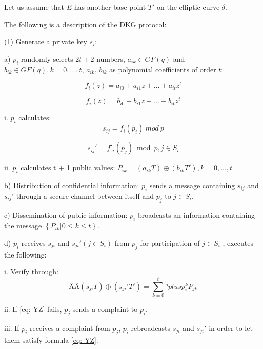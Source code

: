 \documentclass[a4paper,12pt]{article}
\begin{document}
Let us assume that $E$ has another base point $T'$ on the elliptic curve $\delta$.

The following is a description of the DKG protocol:

(1) Generate a private key ${s_i}$:

a) $p_{i}$ randomly selects $2t + 2$ numbers, $a_{ik} \in GF (q)$ and $b_{ik} \in GF (q), k = 0,..., t$, $a_{ik}$, $b_{ik}$ as polynomial coefficients of order $t$:

\begin{equation}
  \label{eq: TA}
  f_i (z) = a_{i0} + a_{i1} z + ... + a_{it} z^t
\end{equation}

\begin{equation}
  \label{eq: TA}
  f_i (z) = b_{i0} + b_{i1} z + ... + b_{it} z^t
\end{equation}

i. $p_i$ calculates:
\begin{equation}
  \label{eq: TA}
 s_{ij} = f_i(p_i)\ mod \ p
\end{equation}

\begin{equation}
  \label{eq: TA}
 {s_{ij}}'= f{'_i} \left({{p_j}} \right) \bmod p, j \in{S_i}%
\end{equation}

ii. $p_i$ calculates t + 1 public values: ${P_{ik}} = \left({{a_{ik}} T} \right) \oplus \left({{b_{ik}} T' } \right), k = 0, ..., t$

b) Distribution of confidential information: $p_i$ sends a message containing $s_{ij}$ and ${s_{ij}}'$ through a secure channel between itself and  $p_j$ to $j \in S_i$.

c) Dissemination of public information: $p_i$ broadcasts an information containing the message $\left \{{{P_{ik}}|0 \le k \le t} \right \}$.

d) $ p_i$ receives $s_{ji}$ and ${s_{ji}}'\left(j \in S_i \right)$ from  $ p_j$ for participation of $ j \in S_i$ , executes the following:

i. Verify through:
\begin{equation}
Â Â \label{eq: YZ}
\left({{s_{ji}} T} \right) \oplus \left({{s_{ji}}'T'} \right) = \sum \limits_{k = 0}^t{}^oplus p_i^k{P_{jk}}
\end{equation}

ii. If \ref{eq: YZ} fails, $p_j$ sends a complaint to $p_i$.

iii. If $p_i$ receives a complaint from $p_j$, $ p_i$ rebroadcasts $s_{ji}$ and ${s_{ji}}'$ in order to let them satisfy formula \ref{eq: YZ}.
\end{document}
